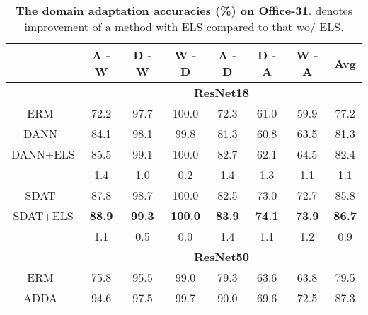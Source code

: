 \documentclass{article} \usepackage{iclr2023_conference,times}
\newcommand{\ls}[0]{ELS\xspace}
\newcommand{\Gray}[0]{\rowcolor{gray!20}}
\begin{document}
\begin{table}[]
\centering
\scriptsize
\caption{\textbf{The domain adaptation accuracies (\%) on Office-31}.  denotes improvement of a method with \ls compared to that wo/ \ls.}\label{tab:offce31}
\begin{tabular}{@{}c|ccccccc@{}}
\toprule
            & \textbf{A - W} & \textbf{D - W} & \textbf{W - D} & \textbf{A - D} & \textbf{D - A} & \textbf{W - A} & \textbf{Avg} \\ \midrule
            & \multicolumn{7}{c}{{\color{brown}\textbf{ResNet18}}}                                                                                       \\
ERM~\citep{vapnik1998statistical}         & 72.2           & 97.7           & 100.0          & 72.3           & 61.0           & 59.9           & 77.2         \\
DANN~\citep{ganin2016domain}        & 84.1           & 98.1           & 99.8           & 81.3           & 60.8           & 63.5           & 81.3         \\\Gray
DANN+ELS    & 85.5           & 99.1           & 100.0          & 82.7           & 62.1           & 64.5           & 82.4         \\\Gray
 & 1.4            & 1.0            & 0.2            & 1.4            & 1.3            & 1.1            & 1.1          \\
SDAT~\citep{rangwani2022closer}        & 87.8           & 98.7           & 100.0          & 82.5           & 73.0           & 72.7           & 85.8         \\\Gray
SDAT+ELS    & \textbf{88.9}           & \textbf{99.3}           & \textbf{100.0 }         & \textbf{83.9}           & \textbf{74.1}           & \textbf{73.9}           & \textbf{86.7}         \\\Gray
 & 1.1            & 0.5            & 0.0            & 1.4            & 1.1            & 1.2            & 0.9          \\\hline\hline
            & \multicolumn{7}{c}{{{\color{brown}\textbf{ResNet50}}}}                                                                                       \\
ERM~\citep{vapnik1998statistical}         & 75.8           & 95.5           & 99.0           & 79.3           & 63.6           & 63.8           & 79.5         \\
ADDA~\citep{tzeng2017adversarial}        & 94.6           & 97.5           & 99.7           & 90.0           & 69.6           & 72.5           & 87.3         \\

\end{tabular}
\end{table}
\end{document}
